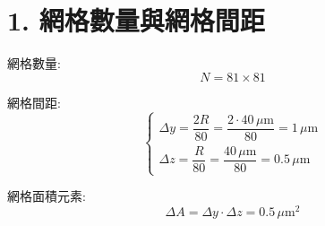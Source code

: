 \documentclass[12pt,a4paper]{article}
\begin{document}
\section*{1. 網格數量與網格間距}

網格數量:
\[
N = 81 \times 81
\]

網格間距:
\[
\begin{cases}
\Delta y = \dfrac{2R}{80} = \dfrac{2 \cdot 40\,\mu\mathrm{m}}{80} = 1\,\mu\mathrm{m} \\[10pt]
\Delta z = \dfrac{R}{80} = \dfrac{40\,\mu\mathrm{m}}{80} = 0.5\,\mu\mathrm{m}
\end{cases}
\]

網格面積元素:
\[
\Delta A = \Delta y \cdot \Delta z = 0.5\,\mu\mathrm{m}^2
\]
\end{document}
